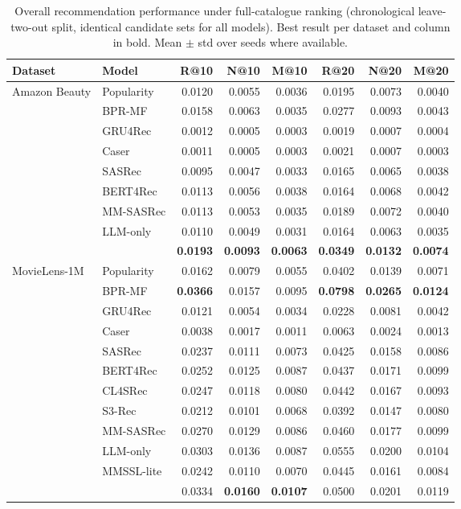 \begin{table}[t]
\centering
\caption{Overall recommendation performance under full-catalogue ranking (chronological leave-two-out split, identical candidate sets for all models). Best result per dataset and column in bold. Mean $\pm$ std over seeds where available.}
\label{tab:overall}
\small
\begin{tabular}{llrrrrrr}
\toprule
Dataset & Model & R@10 & N@10 & M@10 & R@20 & N@20 & M@20 \\
\midrule
\multirow{9}{*}{Amazon Beauty}
 & Popularity & 0.0120 & 0.0055 & 0.0036 & 0.0195 & 0.0073 & 0.0040 \\
 & BPR-MF & 0.0158 & 0.0063 & 0.0035 & 0.0277 & 0.0093 & 0.0043 \\
 & GRU4Rec & 0.0012 & 0.0005 & 0.0003 & 0.0019 & 0.0007 & 0.0004 \\
 & Caser & 0.0011 & 0.0005 & 0.0003 & 0.0021 & 0.0007 & 0.0003 \\
 & SASRec & 0.0095 & 0.0047 & 0.0033 & 0.0165 & 0.0065 & 0.0038 \\
 & BERT4Rec & 0.0113 & 0.0056 & 0.0038 & 0.0164 & 0.0068 & 0.0042 \\
 & MM-SASRec & 0.0113 & 0.0053 & 0.0035 & 0.0189 & 0.0072 & 0.0040 \\
 & LLM-only & 0.0110 & 0.0049 & 0.0031 & 0.0164 & 0.0063 & 0.0035 \\
 & \model{} & \textbf{0.0193} & \textbf{0.0093} & \textbf{0.0063} & \textbf{0.0349} & \textbf{0.0132} & \textbf{0.0074} \\
\midrule
\multirow{12}{*}{MovieLens-1M}
 & Popularity & 0.0162 & 0.0079 & 0.0055 & 0.0402 & 0.0139 & 0.0071 \\
 & BPR-MF & \textbf{0.0366} & 0.0157 & 0.0095 & \textbf{0.0798} & \textbf{0.0265} & \textbf{0.0124} \\
 & GRU4Rec & 0.0121 & 0.0054 & 0.0034 & 0.0228 & 0.0081 & 0.0042 \\
 & Caser & 0.0038 & 0.0017 & 0.0011 & 0.0063 & 0.0024 & 0.0013 \\
 & SASRec & 0.0237 & 0.0111 & 0.0073 & 0.0425 & 0.0158 & 0.0086 \\
 & BERT4Rec & 0.0252 & 0.0125 & 0.0087 & 0.0437 & 0.0171 & 0.0099 \\
 & CL4SRec & 0.0247 & 0.0118 & 0.0080 & 0.0442 & 0.0167 & 0.0093 \\
 & S3-Rec & 0.0212 & 0.0101 & 0.0068 & 0.0392 & 0.0147 & 0.0080 \\
 & MM-SASRec & 0.0270 & 0.0129 & 0.0086 & 0.0460 & 0.0177 & 0.0099 \\
 & LLM-only & 0.0303 & 0.0136 & 0.0087 & 0.0555 & 0.0200 & 0.0104 \\
 & MMSSL-lite & 0.0242 & 0.0110 & 0.0070 & 0.0445 & 0.0161 & 0.0084 \\
 & \model{} & 0.0334 & \textbf{0.0160} & \textbf{0.0107} & 0.0500 & 0.0201 & 0.0119 \\
\bottomrule
\end{tabular}
\end{table}
